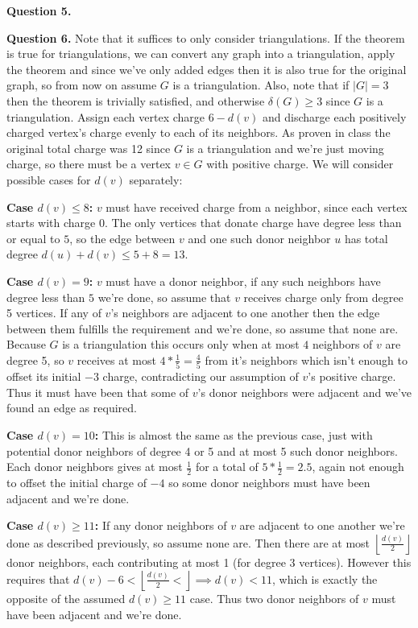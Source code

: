 \documentclass[letterpaper, reqno,11pt]{article}
\begin{document}
{\medskip\noindent\bf Question 5.}  

{\medskip\noindent\bf Question 6.} Note that it suffices to only consider triangulations. If the theorem is true for triangulations, we can convert any graph into a triangulation, apply the theorem and since we've only added edges then it is also true for the original graph, so from now on assume $G$ is a triangulation. Also, note that if $|G|=3$ then the theorem is trivially satisfied, and otherwise $\delta(G)\geq 3$ since $G$ is a triangulation. Assign each vertex charge $6-d(v)$ and discharge each positively charged vertex's charge evenly to each of its neighbors. As proven in class the original total charge was 12 since $G$ is a triangulation and we're just moving charge, so there must be a vertex $v\in G$ with positive charge. We will consider possible cases for $d(v)$ separately: 

\medskip

{\noindent\bf Case $d(v)\leq 8$:} $v$ must have received charge from a neighbor, since each vertex starts with charge $0$. The only vertices that donate charge have degree less than or equal to $5$, so the edge between $v$ and one such donor neighbor $u$ has total degree $d(u)+d(v)\leq 5+8=13$.

{\noindent\bf Case $d(v)=9$:} $v$ must have a donor neighbor, if any such neighbors have degree less than $5$ we're done, so assume that $v$ receives charge only from degree 5 vertices. If any of $v$'s neighbors are adjacent to one another then the edge between them fulfills the requirement and we're done, so assume that none are. Because $G$ is a triangulation this occurs only when at most $4$ neighbors of $v$ are degree 5, so $v$ receives at most $4*\frac{1}{5}=\frac{4}{5}$ from it's neighbors which isn't enough to offset its initial $-3$ charge, contradicting our assumption of $v$'s positive charge. Thus it must have been that some of $v$'s donor neighbors were adjacent and we've found an edge as required. 

{\noindent\bf Case $d(v)=10$:} This is almost the same as the previous case, just with potential donor neighbors of degree 4 or 5 and at most 5 such donor neighbors. Each donor neighbors gives at most $\frac{1}{2}$ for a total of $5*\frac{1}{2}=2.5$, again not enough to offset the initial charge of $-4$ so some donor neighbors must have been adjacent and we're done.

{\noindent\bf Case $d(v)\geq 11$:} If any donor neighbors of $v$ are adjacent to one another we're done as described previously, so assume none are. Then there are at most $\left\lfloor \frac{d(v)}{2} \right\rfloor$ donor neighbors, each contributing at most 1 (for degree 3 vertices). However this requires that $d(v)-6< \left\lfloor \frac{d(v)}{2} <\right\rfloor\implies d(v)<11$, which is exactly the opposite of the assumed $d(v)\geq 11$ case. Thus two donor neighbors of $v$ must have been adjacent and we're done. 
\end{document}

